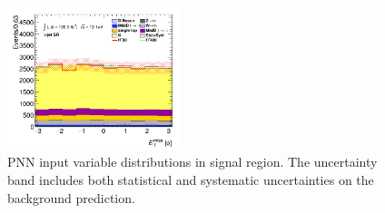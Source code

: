 \begin{figure}[!htp]
\begin{center}
			\includegraphics[width=0.45\textwidth]{chapters/chapter6_HPlus/images/taujets/met_phi_SR_TAUJET.png} 
			\end{center}
			\caption{
			PNN input variable distributions in \taujets signal region. The uncertainty band includes both statistical and systematic uncertainties on the background prediction. 
			}
			\label{fig:sr-taujets-1}
		\end{figure}

